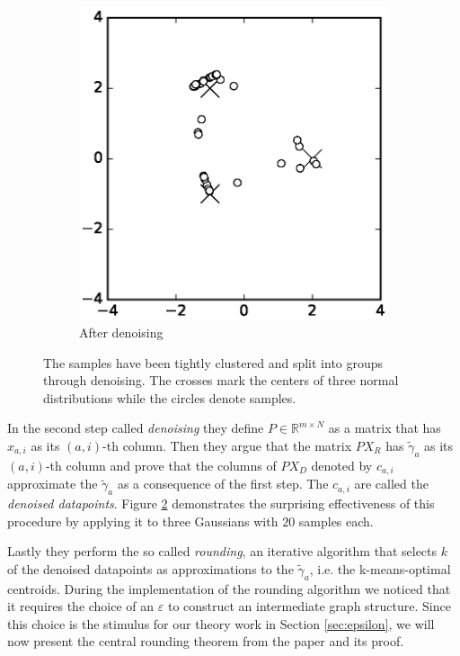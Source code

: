 \documentclass[10pt,a4paper]{article}
\begin{document}
\begin{figure}[h!]
\begin{subfigure}{0.3\textwidth}
    \includegraphics[width=\textwidth]{figures/denoising-denoised}
    \caption{After denoising}
    \label{fig:denoised}
  \end{subfigure}
  \caption{The samples have been tightly clustered and split into groups through denoising. The crosses mark the centers of three normal distributions while the circles denote samples.}
  \label{fig:denoising}
\end{figure}

In the second step called \emph{denoising} they define $P \in \mathbb{R}^{m \times N}$ as a matrix that has $x_{a, i}$ as its $(a, i)$-th column.
Then they argue that the matrix $PX_{R}$ has $\tilde{\gamma}_{a}$ as its $(a, i)$-th column and prove that the columns of $PX_{D}$ denoted by $c_{a, i}$ approximate the $\tilde{\gamma}_{a}$ as a consequence of the first step.
The $c_{a, i}$ are called the \emph{denoised datapoints}.
Figure \ref{fig:denoising} demonstrates the surprising effectiveness of this procedure by applying it to three Gaussians with $20$ samples each.

Lastly they perform the so called \emph{rounding}, an iterative algorithm that selects $k$ of the denoised datapoints as approximations to the $\tilde{\gamma}_{a}$, i.e. the k-means-optimal centroids.
During the implementation of the rounding algorithm we noticed that it requires the choice of an $\varepsilon$ to construct an intermediate graph structure.
Since this choice is the stimulus for our theory work in Section \ref{sec:epsilon}, we will now present the central rounding theorem from the paper and its proof.
\end{document}
